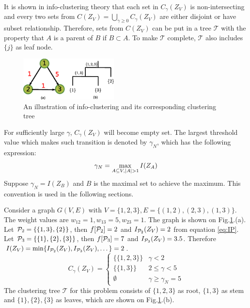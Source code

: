 \documentclass[runningheads]{llncs}
\begin{document}
It is shown in info-clustering theory that each set in $C_{\gamma} (Z_V)$ is non-intersecting and every two sets from $C(Z_V)=\bigcup_{\gamma \geq 0} C_{\gamma}(Z_V)$ are either disjoint or have subset relationship. Therefore, sets from $C(Z_V)$ can be put in a tree $\mathcal{T}$ with the property that $A$ is a parent of $B$ if $B\subset A$. To make $\mathcal{T}$ complete, $\mathcal{T}$ also includes $\{j\}$ as leaf node. 

\begin{figure}
	\begin{center}
		\includegraphics[width=0.44\textwidth]{pic/example_directed.eps}
	\end{center}
	\caption{An illustration of info-clustering and its corresponding clustering tree}\label{fig:first_illustration}
\end{figure}

For sufficiently large $\gamma$, $C_{\gamma} (Z_V)$ will become empty set. The largest threshold value which makes such transition is denoted by $\gamma_N$, which has the following expression:
\begin{equation}\label{eq:gammaN}
\gamma_N = \max_{A\subseteq V, \abs{A}>1} I(Z_A)
\end{equation}
Suppose $\gamma_N=I(Z_B)$ and $B$ is the maximal set to achieve the maximum. This convention is used in the following sections.

\begin{example}
	Consider a graph $G(V,E)$ with $V=\{1,2,3\}, E=\{(1,2),(2,3),(1,3)\}$. The weight values are $w_{12}=1, w_{13}=5, w_{23}=1$. The graph is shown on Fig.\ref{fig:first_illustration}.(a). Let $\P_2 = \{\{1,3\},\{2\}\}$, then $f[\P_2] = 2 $ and $I_{\P_2}(Z_V) = 2$ from equation \eqref{eq:IP}. Let $\P_3 = \{\{1\},\{2\},\{3\}\}$, then $f[\P_3] = 7$ and $I_{\P_3}(Z_V)=3.5$. Therefore $I(Z_V) = \min\{I_{\P_2}(Z_V), I_{\P_3}(Z_V), \dots\} = 2$. 
	\begin{equation*}
	C_{\gamma}(Z_V)	=\begin{cases}
					\{\{1,2,3\}\} & \gamma < 2 \\
					\{\{1,3\}\} & 2\leq \gamma < 5 \\
					\emptyset & \gamma \geq \gamma_N = 5
		\end{cases}
	\end{equation*}
	The clustering tree $\mathcal{T}$ for this problem consists of $\{1,2,3\}$ as root, $\{1,3\}$ as stem and $\{1\},\{2\},\{3\}$ as leaves, which are shown on Fig.\ref{fig:first_illustration}.(b).
\end{example}	
\end{document}
